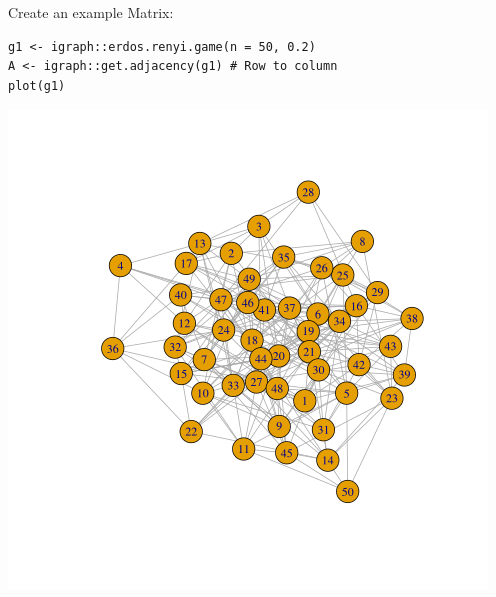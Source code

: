 \documentclass[11pt]{article}
\begin{document}
Create an example Matrix:
\lstset{language=r,label= ,caption= ,captionpos=b,numbers=none}
\begin{lstlisting}
g1 <- igraph::erdos.renyi.game(n = 50, 0.2)
A <- igraph::get.adjacency(g1) # Row to column
plot(g1)
\end{lstlisting}

\begin{center}
\includegraphics[width=.9\linewidth]{power-walk-example-graph.png}
\end{center}
\end{document}
